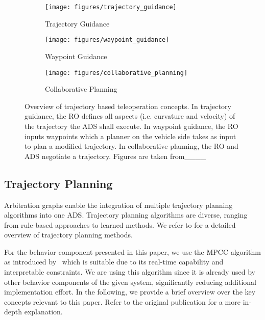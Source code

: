 \begin{figure*}[hbp]
    \centering 
    \begin{subfigure}{0.33\textwidth}
        \texttt{[image: figures/trajectory\_guidance]}
        \\[-0.3 cm]
        \caption{Trajectory Guidance}
        \label{fig:tg}
    \end{subfigure}%
    \hfill
    \begin{subfigure}{0.33\textwidth}
        \texttt{[image: figures/waypoint\_guidance]}
        \\[-0.3 cm]
        \caption{Waypoint Guidance}
        \label{fig:wg}
    \end{subfigure}%
    \hfill
    \begin{subfigure}{0.33\textwidth}
        \texttt{[image: figures/collaborative\_planning]}
        \\[-0.3 cm]
        \caption{Collaborative Planning}
        \label{fig:cp}
    \end{subfigure}
    \caption{Overview of trajectory based teleoperation concepts. In trajectory guidance, the \gls{RO} defines all aspects (i.e. curvature and velocity) of the trajectory the \gls{ADS} shall execute. In waypoint guidance, the \gls{RO} inputs waypoints which a planner on the vehicle side takes as input to plan a modified trajectory. In collaborative planning, the \gls{RO} and \gls{ADS} negotiate a trajectory. Figures are taken from____}
    \label{fig:test}
\end{figure*}

\subsection{Trajectory Planning}

Arbitration graphs enable the integration of multiple trajectory planning algorithms into one \gls{ADS}.
Trajectory planning algorithms are diverse, ranging from rule-based approaches to learned methods.
We refer to \textcite{schwartingPlanningDecisionMakingAutonomous2018} for a detailed overview of trajectory planning methods.

For the  behavior component presented in this paper, we use the \gls{MPCC} algorithm as introduced by~\textcite{paulsRealtimeCooperativeMotion2022} which is suitable due to its real-time capability and interpretable constraints.
We are using this algorithm since it is already used by other behavior components of the given system, significantly reducing additional implementation effort.
In the following, we provide a brief overview over the key concepts relevant to this paper.
Refer to the original publication for a more in-depth explanation.

